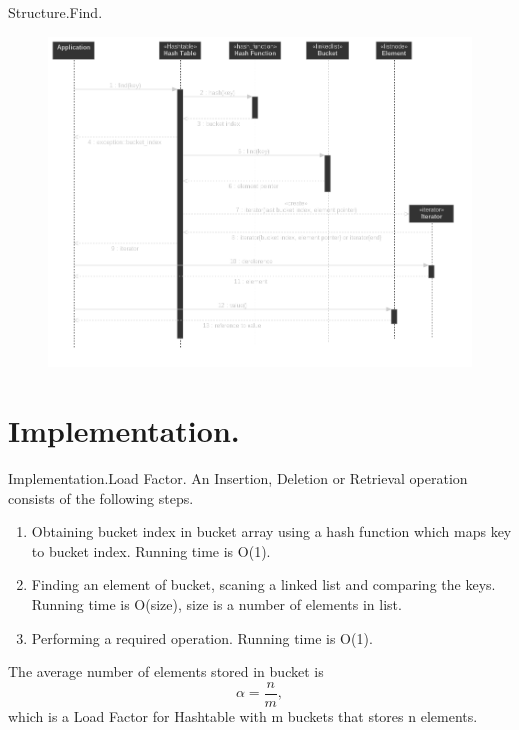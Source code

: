 \documentclass{beamer}
\begin{document}
\begin{frame}{Structure.}{Find.}
  \begin{figure}
    \includegraphics[scale=0.3]{structure_find_sequence}
  \end{figure}
\end{frame}





\section{Implementation.}

\begin{frame}{Implementation.}{Load Factor.}
  An Insertion, Deletion or Retrieval operation consists of the following steps.
  \begin{enumerate}
  \item Obtaining bucket index in bucket array using a hash function which maps key to bucket index.
    Running time is O(1).
  \item Finding an element of bucket, scaning a linked list and comparing the keys.
    Running time is O(size), size is a number of elements in list. 
    \item Performing a required operation. Running time is O(1).
  \end{enumerate}

  \par The average number of elements stored in bucket is
  \begin{equation}
    \alpha = \frac{n}{m},
  \end{equation}
  which is a Load Factor for Hashtable with m buckets that stores n elements.
\end{frame}
\end{document}
